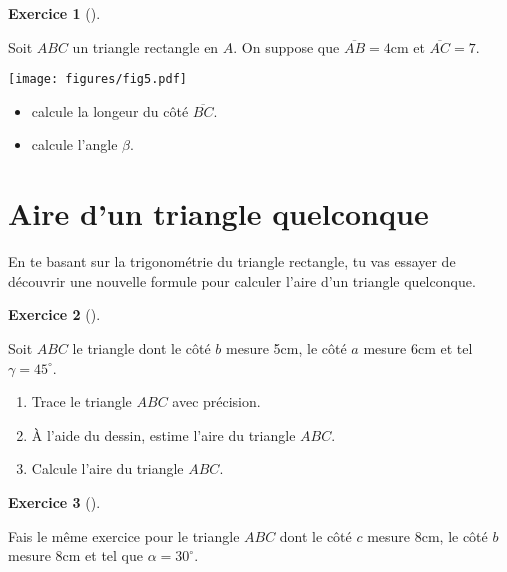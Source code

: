 \documentclass[
  a4paper,
  DIV=11,
  numbers=noendperiod,
  oneside]{scrreprt}
\providecommand{\tightlist}{%
  \setlength{\itemsep}{0pt}\setlength{\parskip}{0pt}}\usepackage{longtable,booktabs,array}
\theoremstyle{definition}
\theoremstyle{definition}
\newtheorem{exercise}{Exercice}[chapter]
\theoremstyle{plain}
\theoremstyle{definition}
\theoremstyle{remark}
\begin{document}
\begin{exercise}[]\protect\hypertarget{exr-calculs}{}\label{exr-calculs}

Soit \(ABC\) un triangle rectangle en \(A\). On suppose que
\(\overline{AB}=4\)cm et \(\overline{AC}=7\).

\begin{center}
\texttt{[image: figures/fig5.pdf]}
\end{center}

\begin{itemize}
\tightlist
\item
  calcule la longeur du côté \(\overline{BC}\).
\item
  calcule l'angle \(\beta\).
\end{itemize}

\end{exercise}

\section{Aire d'un triangle
quelconque}\label{aire-dun-triangle-quelconque}

En te basant sur la trigonométrie du triangle rectangle, tu vas essayer
de découvrir une nouvelle formule pour calculer l'aire d'un triangle
quelconque.

\begin{exercise}[]\protect\hypertarget{exr-1}{}\label{exr-1}

Soit \(ABC\) le triangle dont le côté \(b\) mesure 5cm, le côté \(a\)
mesure 6cm et tel \(\gamma=45^\circ\).

\begin{enumerate}
\def\labelenumi{\arabic{enumi}.}
\tightlist
\item
  Trace le triangle \(ABC\) avec précision.
\item
  À l'aide du dessin, estime l'aire du triangle \(ABC\).
\item
  Calcule l'aire du triangle \(ABC\).
\end{enumerate}

\end{exercise}

\begin{exercise}[]\protect\hypertarget{exr-2}{}\label{exr-2}

Fais le même exercice pour le triangle \(ABC\) dont le côté \(c\) mesure
8cm, le côté \(b\) mesure 8cm et tel que \(\alpha=30^\circ\).

\end{exercise}
\end{document}
